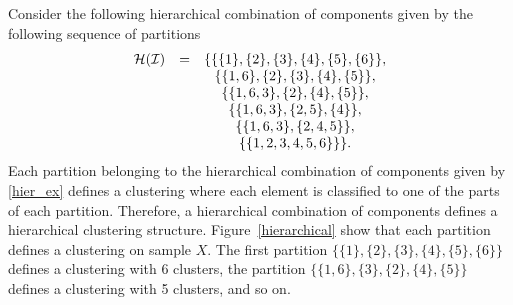 \documentclass[10pt, a4paper]{article}
\begin{document}
%

Consider the following hierarchical combination of components given by the following sequence of partitions
\begin{equation}
\begin{array}{r c c}
\mathcal{H}(\mathcal{I}) &=& \{ \{\{1\},\{2\},\{3\},\{4\},\{5\},\{6\}\}, \\
   & & \{\{1, 6\},\{2\},\{3\},\{4\},\{5\} \}, \\
   & &    \{\{1, 6, 3\},\{2\},\{4\},\{5\} \}, \\
   & &    \{\{1, 6, 3\},\{2, 5\},\{4 \} \}, \\
    & &   \{\{1, 6, 3\},\{2, 4, 5\} \}, \\
   & &    \{\{1, 2, 3, 4, 5, 6\}\} \}.
\end{array}
\label{hier_ex}
\end{equation}
Each partition belonging to the hierarchical combination of components given by \ref{hier_ex} defines a clustering where each element is classified to one of the parts of each partition. Therefore, a hierarchical combination of components defines a hierarchical clustering structure. Figure~\ref{hierarchical} show that each partition defines a clustering on sample $X$. The first partition $\{\{1\},\{2\},\{3\},\{4\},\{5\},\{6\}\}$ defines a clustering with 6 clusters, the partition $\{\{1, 6\}, \{3\},\{2\},\{4\},\{5\} \}$ defines a clustering with 5 clusters, and so on.
\end{document}
